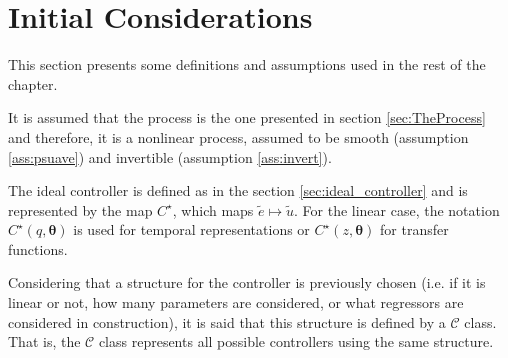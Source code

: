 \section{Initial Considerations}\label{sec:vrft_Init_Cons}
This section presents some definitions and assumptions used in the rest of the chapter.

\begin{assum}
   It is assumed that the process is the one presented in section \ref{sec:TheProcess} and therefore, it is a nonlinear process, assumed to be smooth (assumption \ref{ass:psuave}) and invertible (assumption \ref{ass:invert}).
\end{assum}

\begin{defn}\label{def:idealControler}
   The ideal controller is defined as in the section \ref{sec:ideal_controller} and is represented by the map $C^\star $, which maps $\tilde{e}\mapsto \tilde{u}$. For the linear case, the notation $C^\star(q,\bm{\theta})$ is used for temporal representations or $C^\star (z,\bm{\theta})$ for transfer functions.
\end{defn}

Considering that a structure for the controller is previously chosen (i.e. if it is linear or not, how many parameters are considered, or what regressors are considered in construction), it is said that this structure is defined by a $\mathscr{C}$ class. That is, the $\mathscr{C}$ class represents all possible controllers using the same structure.

